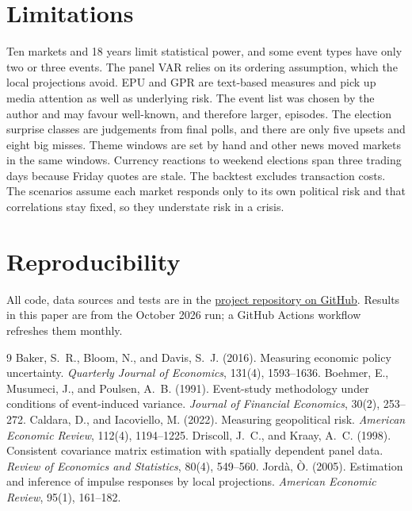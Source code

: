 \documentclass[11pt]{article}
\begin{document}
\section{Limitations}
Ten markets and 18 years limit statistical power, and some event types have only two or three events. The panel VAR relies on its ordering assumption, which the local projections avoid. EPU and GPR are text-based measures and pick up media attention as well as underlying risk. The event list was chosen by the author and may favour well-known, and therefore larger, episodes. The election surprise classes are judgements from final polls, and there are only five upsets and eight big misses. Theme windows are set by hand and other news moved markets in the same windows. Currency reactions to weekend elections span three trading days because Friday quotes are stale. The backtest excludes transaction costs. The scenarios assume each market responds only to its own political risk and that correlations stay fixed, so they understate risk in a crisis.

\section*{Reproducibility}
All code, data sources and tests are in the \href{https://github.com/divvygupta/political-risk-global-equity-mix}{project repository on GitHub}. Results in this paper are from the October 2026 run; a GitHub Actions workflow refreshes them monthly.

\begin{thebibliography}{9}
 Baker, S.~R., Bloom, N., and Davis, S.~J. (2016). Measuring economic policy uncertainty. \emph{Quarterly Journal of Economics}, 131(4), 1593--1636.
 Boehmer, E., Musumeci, J., and Poulsen, A.~B. (1991). Event-study methodology under conditions of event-induced variance. \emph{Journal of Financial Economics}, 30(2), 253--272.
 Caldara, D., and Iacoviello, M. (2022). Measuring geopolitical risk. \emph{American Economic Review}, 112(4), 1194--1225.
 Driscoll, J.~C., and Kraay, A.~C. (1998). Consistent covariance matrix estimation with spatially dependent panel data. \emph{Review of Economics and Statistics}, 80(4), 549--560.
 Jord\`a, \`O. (2005). Estimation and inference of impulse responses by local projections. \emph{American Economic Review}, 95(1), 161--182.
\end{thebibliography}
\end{document}
